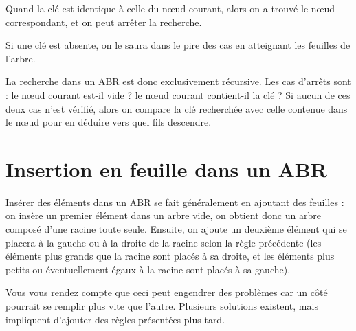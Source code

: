 \documentclass[11pt,a4paper]{article}
\begin{document}
\clearpage


Quand la clé est identique à celle du nœud courant, alors on a trouvé le nœud correspondant, et on peut arrêter la recherche.

Si une clé est absente, on le saura dans le pire des cas en atteignant les feuilles de l'arbre.

\medskip

La recherche dans un ABR est donc exclusivement récursive.
Les cas d'arrêts sont : le nœud courant est-il vide ? le nœud courant contient-il la clé ?
Si aucun de ces deux cas n'est vérifié, alors on compare la clé recherchée avec celle contenue dans le nœud pour en déduire vers quel fils descendre.





\section{Insertion en feuille dans un ABR}

Insérer des éléments dans un ABR se fait généralement en ajoutant des feuilles : on insère un premier élément dans un arbre vide, on obtient donc un arbre composé d'une racine toute seule.
Ensuite, on ajoute un deuxième élément qui se placera à la gauche ou à la droite de la racine selon la règle précédente (les éléments plus grands que la racine sont placés à sa droite, et les éléments plus petits ou éventuellement égaux à la racine sont placés à sa gauche).

\medskip

Vous vous rendez compte que ceci peut engendrer des problèmes car un côté pourrait se remplir plus vite que l'autre.
Plusieurs solutions existent, mais impliquent d'ajouter des règles présentées plus tard.



\end{document}
